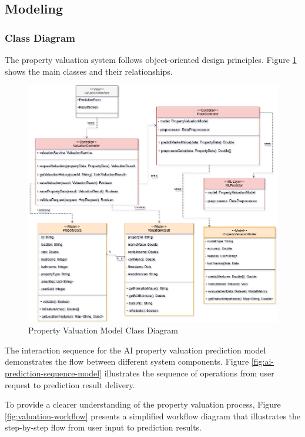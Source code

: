 \subsection{Modeling}
\subsubsection{Class Diagram}
The property valuation system follows object-oriented design principles. Figure \ref{fig:valuation-class-diagram} shows the main classes and their relationships.

\begin{figure}[htbp]
    \centering
    \includegraphics[width=1\textwidth]{images/valuation_class_diagram.png}
    \caption{Property Valuation Model Class Diagram}
    \label{fig:valuation-class-diagram}
\end{figure}


The interaction sequence for the AI property valuation prediction model demonstrates the flow between different system components. Figure \ref{fig:ai-prediction-sequence-model} illustrates the sequence of operations from user request to prediction result delivery.

To provide a clearer understanding of the property valuation process, Figure \ref{fig:valuation-workflow} presents a simplified workflow diagram that illustrates the step-by-step flow from user input to prediction results.

